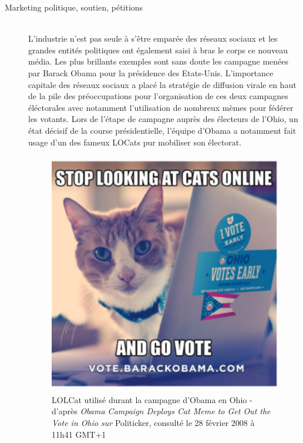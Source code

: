 \begin{description}
\item[Marketing politique, soutien, p\'etitions]
\hfill \\
L{\textquoteright}industrie n{\textquoteright}est pas seule \`a s{\textquoteright}\^etre empar\'ee des r\'eseaux sociaux et les grandes entit\'es politiques ont \'egalement saisi \`a bras le corps ce nouveau m\'edia. Les plus brillants exemples sont sans doute les campagne men\'ees par Barack Obama pour la pr\'esidence des Etats-Unis. L{\textquoteright}importance capitale des r\'eseaux sociaux a plac\'e la strat\'egie de diffusion virale en haut de la pile des pr\'eoccupations pour l{\textquoteright}organisation de ces deux campagnes \'el\'ectorales \citep{Miller2008} avec notamment l{\textquoteright}utilisation de nombreux m\`emes pour f\'ed\'erer les votants. Lors de l{\textquoteright}\'etape de campagne aupr\`es des \'electeurs de l{\textquoteright}Ohio, un \'etat d\'ecisif de la course pr\'esidentielle, l{\textquoteright}\'equipe d{\textquoteright}Obama a notamment fait usage d{\textquoteright}un des fameux LOCats pur mobiliser son \'electorat. 


\begin{figure}
    \centering
    \includegraphics[width=4.1669in,height=4.178in]{figures/chap2/chapitre2-img16.png}
    \caption[Lolcat utilisé lors la campagne d'Obama]{ 
        LOLCat utilis\'e durant la campagne d{\textquoteright}Obama en Ohio - d{\textquoteright}apr\`es \textit{Obama Campaign Deploys Cat Meme to Get Out the Vote in Ohio sur }Politicker, consult\'e le 28 f\'evrier 2008 \`a 11h41 GMT+1
    } 
    \label{fig:obama-cat}
\end{figure}


\end{description}

